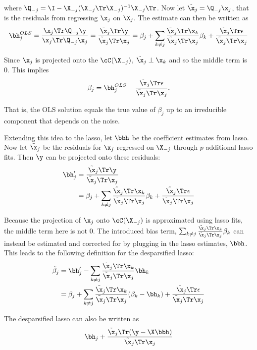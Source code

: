 \noindent where $\Q_{-j} = \I - \X_{-j}(\X_{-j}\Tr\X_{-j})^{-1}\X_{-j}\Tr$. Now let $\tilde{\x}_j = \Q_{-j}\x_j$, that is the residuals from regressing $\x_j$ on $\X_j$. The estimate can then be written as
$$
\bh_j^{OLS} = \frac{\x_j\Tr \Q_{-j} \y}{\x_j\Tr \Q_{-j} \x_j} = \frac{\tilde{\x}_j\Tr \y}{\tilde{\x}_j\Tr \x_j} = \beta_j + \sum_{k \neq j} \frac{\tilde{\x}_j\Tr \x_k}{\tilde{\x}_j\Tr \x_j}\beta_k + \frac{\tilde{\x}_j\Tr \epsilon}{\tilde{\x}_j\Tr \x_j}
$$

\noindent Since $\x_j$ is projected onto the $\cC(\X_{-j})$, $\tilde{\x}_j \perp \x_k$ and so the middle term is 0. This implies 
$$
\beta_j = \bh_j^{OLS} -  \frac{\tilde{\x}_j\Tr \epsilon}{\tilde{\x}_j\Tr \x_j}.
$$

\noindent That is, the OLS solution equals the true value of $\beta_j$ up to an irreducible component that depends on the noise.

Extending this idea to the lasso, let $\bbh$ be the coefficient estimates from lasso. Now let $\tilde{\x}_j$ be the residuals for $\x_j$ regressed on $\X_{-j}$ through $p$ additional lasso fits. Then $\y$ can be projected onto these residuals:
$$
\begin{aligned}
\bh'_j &= \frac{\tilde{\x}_j \Tr \y}{\tilde{\x}_j \Tr \x_j} \\
&= \beta_j +  \sum_{k \neq j} \frac{\tilde{\x}_j \Tr \x_k}{\tilde{\x}_j \Tr \x_j}\beta_k + \frac{\tilde{\x}_j \Tr \epsilon}{\tilde{\x}_j \Tr \x_j}
\end{aligned}
$$

\noindent Because the projection of $\x_j$ onto $\cC(\X_{-j})$ is approximated using lasso fits, the middle term here is not 0. The introduced bias term, $\sum_{k \neq j} \frac{\tilde{\x}_j \Tr \x_k}{\tilde{\x}_j \Tr \x_j}\beta_k$ can instead be estimated and corrected for by plugging in the lasso estimates, $\bbh$. This leads to the following definition for the desparsified lasso:
$$
\begin{aligned}
\tilde{\beta}_j &= \bh'_j - \sum_{k \neq j} \frac{\tilde{\x}_j \Tr \x_k}{\tilde{\x}_j \Tr \x_j}\bh_k \\
&= \beta_j + \sum_{k \neq j} \frac{\tilde{\x}_j \Tr \x_k}{\tilde{\x}_j \Tr \x_j}(\beta_k - \bh_k) + \frac{\tilde{\x}_j \Tr \epsilon}{\tilde{\x}_j \Tr \x_j} 
\end{aligned}
$$

\noindent The desparsified lasso can also be written as
$$
\bh_j + \frac{\tilde{\x}_j \Tr (\y - \X \bbh)}{\tilde{\x}_j \Tr \x_j} 
$$

